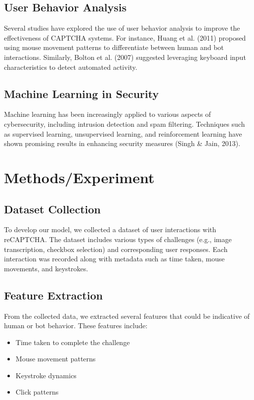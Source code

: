 \subsection{User Behavior Analysis}
Several studies have explored the use of user behavior analysis to improve the effectiveness of CAPTCHA systems. For instance, Huang et al. (2011) proposed using mouse movement patterns to differentiate between human and bot interactions. Similarly, Bolton et al. (2007) suggested leveraging keyboard input characteristics to detect automated activity.

\subsection{Machine Learning in Security}
Machine learning has been increasingly applied to various aspects of cybersecurity, including intrusion detection and spam filtering. Techniques such as supervised learning, unsupervised learning, and reinforcement learning have shown promising results in enhancing security measures (Singh & Jain, 2013).

\section{Methods/Experiment}
\label{sec:methods_experiment}
\subsection{Dataset Collection}
To develop our model, we collected a dataset of user interactions with reCAPTCHA. The dataset includes various types of challenges (e.g., image transcription, checkbox selection) and corresponding user responses. Each interaction was recorded along with metadata such as time taken, mouse movements, and keystrokes.

\subsection{Feature Extraction}
From the collected data, we extracted several features that could be indicative of human or bot behavior. These features include:
\begin{itemize}
    \item Time taken to complete the challenge
    \item Mouse movement patterns
    \item Keystroke dynamics
    \item Click patterns
\end{itemize}

